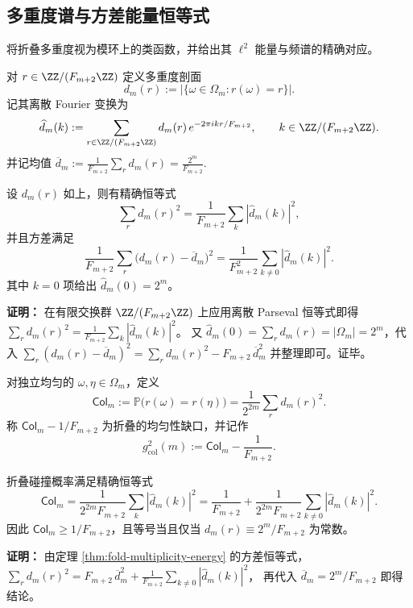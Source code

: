 \subsection{多重度谱与方差能量恒等式}
将折叠多重度视为模环上的类函数，并给出其 $\ell^2$ 能量与频谱的精确对应。

\begin{definition}[多重度谱]
对 $r\in\ZZ/(F_{m+2}\ZZ)$ 定义多重度剖面
\[
d_m(r):=\bigl|\{\omega\in\Omega_m:r(\omega)=r\}\bigr|.
\]
记其离散 Fourier 变换为
\[
\widehat d_m(k):=\sum_{r\in\ZZ/(F_{m+2}\ZZ)} d_m(r)\,e^{-2\pi i kr/F_{m+2}},
\qquad k\in\ZZ/(F_{m+2}\ZZ).
\]
并记均值
\(
\overline d_m:=\frac{1}{F_{m+2}}\sum_r d_m(r)=\frac{2^m}{F_{m+2}}.
\)
\end{definition}

\begin{theorem}[多重度能量与方差的谱表示]
\label{thm:fold-multiplicity-energy}
设 $d_m(r)$ 如上，则有精确恒等式
\[
\sum_{r} d_m(r)^2=\frac{1}{F_{m+2}}\sum_{k}|\widehat d_m(k)|^2,
\]
并且方差满足
\[
\frac{1}{F_{m+2}}\sum_r\bigl(d_m(r)-\overline d_m\bigr)^2
=\frac{1}{F_{m+2}^2}\sum_{k\ne 0}|\widehat d_m(k)|^2.
\]
其中 $k=0$ 项给出 $\widehat d_m(0)=2^m$。
\end{theorem}

\textbf{证明：}
在有限交换群 $\ZZ/(F_{m+2}\ZZ)$ 上应用离散 Parseval 恒等式即得
\(
\sum_r d_m(r)^2=\frac{1}{F_{m+2}}\sum_k|\widehat d_m(k)|^2
\)。
又 $\widehat d_m(0)=\sum_r d_m(r)=|\Omega_m|=2^m$，代入
\(
\sum_r(d_m(r)-\overline d_m)^2=\sum_r d_m(r)^2-F_{m+2}\,\overline d_m^2
\)
并整理即可。证毕。

\begin{definition}[折叠碰撞概率]
对独立均匀的 $\omega,\eta\in\Omega_m$，定义
\[
\mathsf{Col}_m:=\mathbb{P}\bigl(r(\omega)=r(\eta)\bigr)
=\frac{1}{2^{2m}}\sum_r d_m(r)^2.
\]
称 $\mathsf{Col}_m-1/F_{m+2}$ 为折叠的均匀性缺口，并记作
\[
g_{\mathrm{col}}^2(m):=\mathsf{Col}_m-\frac{1}{F_{m+2}}.
\]
\end{definition}

\begin{theorem}[碰撞概率的谱恒等式]
\label{thm:fold-collision-spectrum}
折叠碰撞概率满足精确恒等式
\[
\mathsf{Col}_m
=\frac{1}{2^{2m}F_{m+2}}\sum_{k}|\widehat d_m(k)|^2
=\frac{1}{F_{m+2}}+\frac{1}{2^{2m}F_{m+2}}\sum_{k\ne 0}|\widehat d_m(k)|^2.
\]
因此 $\mathsf{Col}_m\ge 1/F_{m+2}$，且等号当且仅当 $d_m(r)\equiv 2^m/F_{m+2}$ 为常数。
\end{theorem}

\textbf{证明：}
由定理 \ref{thm:fold-multiplicity-energy} 的方差恒等式，
\(
\sum_r d_m(r)^2=F_{m+2}\,\overline d_m^2+\frac{1}{F_{m+2}}\sum_{k\ne 0}|\widehat d_m(k)|^2
\)，
再代入 $\overline d_m=2^m/F_{m+2}$ 即得结论。

